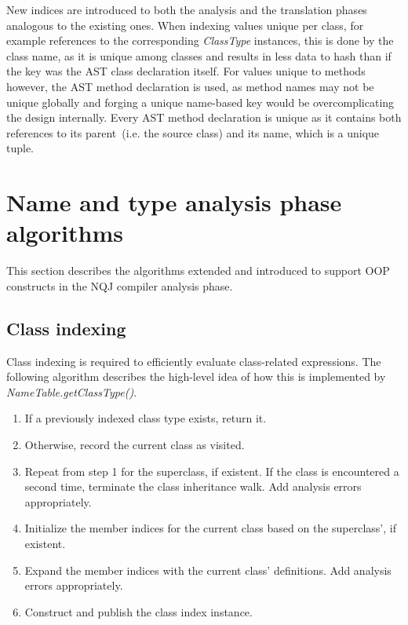 \documentclass[]{tukportfolio}
\begin{document}
New indices are introduced to both the analysis and the translation phases analogous to the existing ones. When indexing values unique per class, for example references to the corresponding \textit{ClassType} instances, this is done by the class name, as it is unique among classes and results in less data to hash than if the key was the AST class declaration itself. For values unique to methods however, the AST method declaration is used, as method names may not be unique globally and forging a unique name-based key would be overcomplicating the design internally. Every AST method declaration is unique as it contains both references to its parent~(i.e. the source class) and its name, which is a unique tuple.

\section{Name and type analysis phase algorithms}

This section describes the algorithms extended and introduced to support OOP constructs in the NQJ compiler analysis phase.

\subsection{Class indexing}
\label{subsec:classindex}

Class indexing is required to efficiently evaluate class-related expressions. The following algorithm describes the high-level idea of how this is implemented by \textit{NameTable.getClassType()}.

\begin{enumerate}
  \item If a previously indexed class type exists, return it.
  \item Otherwise, record the current class as visited.
  \item Repeat from step 1 for the superclass, if existent. If the class is encountered a second time, terminate the class inheritance walk. Add analysis errors appropriately.
  \item Initialize the member indices for the current class based on the superclass', if existent.
  \item Expand the member indices with the current class' definitions. Add analysis errors appropriately.
  \item Construct and publish the class index instance.
\end{enumerate}
\end{document}
